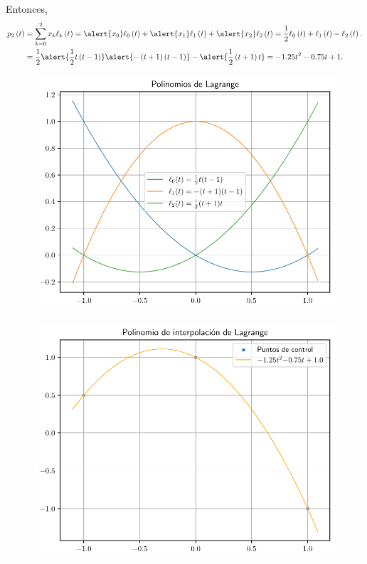 \begin{frame}
\begin{solution}
		Entonces,
		\begin{align*}
			p_{2}\left(t\right) & =
			\sum\limits_{k=0}^{2}
			x_{k}
			\ell_{k}\left(t\right)=
			\alert{x_{0}}\ell_{0}\left(t\right)+
			\alert{x_{1}}\ell_{1}\left(t\right)+
			\alert{x_{2}}\ell_{2}\left(t\right)=
			\dfrac{1}{2}\ell_{0}\left(t\right)+
			\ell_{1}\left(t\right)-
			\ell_{2}\left(t\right). \\
			                    & =
			\dfrac{1}{2}\alert{\dfrac{1}{2}t\left(t-1\right)}
			\alert{-\left(t+1\right)\left(t-1\right)}-
			\alert{\dfrac{1}{2}\left(t+1\right)t}=
			-1.25t^{2}-0.75t+1.
		\end{align*}
	\end{solution}
\end{frame}

\begin{frame}
	\begin{solution}
		\begin{figure}[ht!]
			\centering
			\includegraphics[width=.72\paperwidth]{p6_lagrange}
		\end{figure}
	\end{solution}
\end{frame}


\begin{frame}
	\begin{solution}
		\begin{figure}[ht!]
			\centering
			\includegraphics[width=.72\paperwidth]{p6}
		\end{figure}
	\end{solution}
\end{frame}